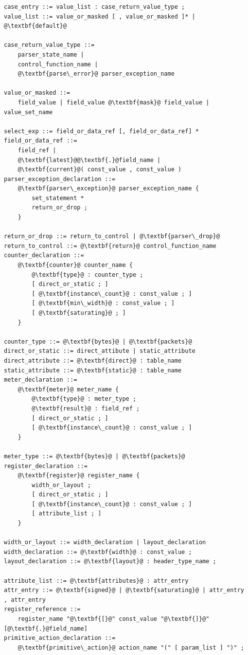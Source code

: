 \documentclass[12pt]{article}
\begin{document}
\begin{lstlisting}[frame=single,backgroundcolor=\color{bnfgreen},escapechar=\@]
case_entry ::= value_list : case_return_value_type ;
value_list ::= value_or_masked [ , value_or_masked ]* | @\textbf{default}@

case_return_value_type ::= 
    parser_state_name | 
    control_function_name | 
    @\textbf{parse\_error}@ parser_exception_name

value_or_masked ::=
    field_value | field_value @\textbf{mask}@ field_value | value_set_name

select_exp ::= field_or_data_ref [, field_or_data_ref] * 
field_or_data_ref ::=
    field_ref |
    @\textbf{latest}@@\textbf{.}@field_name |
    @\textbf{current}@( const_value , const_value )
parser_exception_declaration ::=
    @\textbf{parser\_exception}@ parser_exception_name {
        set_statement *
        return_or_drop ;
    }

return_or_drop ::= return_to_control | @\textbf{parser\_drop}@
return_to_control ::= @\textbf{return}@ control_function_name
counter_declaration ::= 
    @\textbf{counter}@ counter_name {
        @\textbf{type}@ : counter_type ;
        [ direct_or_static ; ]
        [ @\textbf{instance\_count}@ : const_value ; ]
        [ @\textbf{min\_width}@ : const_value ; ]
        [ @\textbf{saturating}@ ; ]
    }

counter_type ::= @\textbf{bytes}@ | @\textbf{packets}@
direct_or_static ::= direct_attibute | static_attribute
direct_attribute ::= @\textbf{direct}@ : table_name
static_attribute ::= @\textbf{static}@ : table_name
meter_declaration ::= 
    @\textbf{meter}@ meter_name {
        @\textbf{type}@ : meter_type ;
        @\textbf{result}@ : field_ref ;
        [ direct_or_static ; ]
        [ @\textbf{instance\_count}@ : const_value ; ]
    }

meter_type ::= @\textbf{bytes}@ | @\textbf{packets}@
register_declaration ::= 
    @\textbf{register}@ register_name {
        width_or_layout ;
        [ direct_or_static ; ]
        [ @\textbf{instance\_count}@ : const_value ; ]
        [ attribute_list ; ]
    }

width_or_layout ::= width_declaration | layout_declaration
width_declaration ::= @\textbf{width}@ : const_value ;
layout_declaration ::= @\textbf{layout}@ : header_type_name ;

attribute_list ::= @\textbf{attributes}@ : attr_entry
attr_entry ::= @\textbf{signed}@ | @\textbf{saturating}@ | attr_entry , attr_entry
register_reference ::=
    register_name "@\textbf{[}@" const_value "@\textbf{]}@" [@\textbf{.}@field_name]
primitive_action_declaration ::= 
    @\textbf{primitive\_action}@ action_name "(" [ param_list ] ")" ;


\end{lstlisting}
\end{document}
